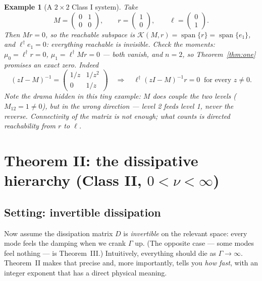 \documentclass[11pt]{article}
\newtheorem{example}{Example}
\newcommand{\spann}{\operatorname{span}}
\newcommand{\kry}{\mathcal K}
\begin{document}
\begin{example}[A $2\times2$ Class I system]
Take
\[
M=\begin{pmatrix}0&1\\0&0\end{pmatrix},\qquad
r=\begin{pmatrix}1\\0\end{pmatrix},\qquad
\ell=\begin{pmatrix}0\\1\end{pmatrix}.
\]
Then $Mr=0$, so the reachable subspace is
$\kry(M,r)=\spann\{r\}=\spann\{e_1\}$, and $\ell^\dagger e_1=0$: everything
reachable is invisible.  Check the moments: $\mu_0=\ell^\dagger r=0$,
$\mu_1=\ell^\dagger Mr=0$ --- both vanish, and $n=2$, so Theorem~\ref{thm:one}
promises an exact zero.  Indeed
\[
(zI-M)^{-1}=\begin{pmatrix}1/z&1/z^2\\0&1/z\end{pmatrix}
\quad\Longrightarrow\quad
\ell^\dagger(zI-M)^{-1}r=0\ \text{ for every }z\neq0 .
\]
Note the drama hidden in this tiny example: $M$ \emph{does} couple the two
levels ($M_{12}=1\neq0$), but in the wrong direction --- level 2 feeds
level 1, never the reverse.  Connectivity of the matrix is not enough; what
counts is directed reachability from $r$ to $\ell$.
\end{example}

\section{Theorem II: the dissipative hierarchy (Class II, $0<\nu<\infty$)}
\label{sec:thm2}

\subsection{Setting: invertible dissipation}

Now assume the dissipation matrix $D$ is \emph{invertible} on the relevant
space: every mode feels the damping when we crank $\Gamma$ up.  (The opposite
case --- some modes feel nothing --- is Theorem~III.)  Intuitively,
everything should die as $\Gamma\to\infty$.  Theorem~II makes that precise
and, more importantly, tells you \emph{how fast}, with an integer exponent
that has a direct physical meaning.
\end{document}
